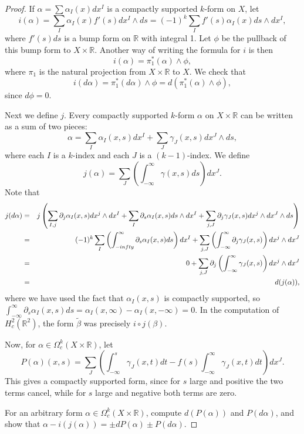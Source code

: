 \documentclass[12pt]{amsbook}
\newcommand{\R}{{\mathbb R}}
\theoremstyle{definition}
\begin{document}
\begin{proof}
If $\alpha = \sum \alpha_I(x) dx^I$ is a compactly supported $k$-form
on $X$, let 
$$i(\alpha) = \sum_I \alpha_I(x) f'(s) dx^I \wedge ds =
(-1)^k \sum_I f'(s) \alpha_I(x) ds \wedge dx^I,$$ 
where $f'(s)ds$ is a
bump form on $\R$ with integral 1.  Let $\phi$ be the pullback of this
bump form to $X \times \R$.  Another way of writing the formula for
$i$ is then
$$i(\alpha) = \pi_1^*(\alpha) \wedge \phi,$$
where $\pi_1$ is the natural projection from $X \times \R$ to $X$. We check that 
$$i(d\alpha) = \pi_1^*(d\alpha) \wedge \phi = d(\pi_1^*(\alpha) \wedge \phi),$$
since $d \phi =0$. 

Next we define $j$. Every compactly supported $k$-form $\alpha$ on $X \times \R$ can be written as a sum of two pieces:
$$ \alpha = \sum_I \alpha_I(x,s) dx^I + \sum_J \gamma_J(x,s) dx^J \wedge ds,$$
where each $I$ is a $k$-index and each $J$ is a $(k-1)$-index. We define
$$j(\alpha) = \sum_J \left ( \int_{-\infty}^\infty \gamma(x,s) ds \right ) dx^J.$$
Note that 
\begin{eqnarray} 
j(d\alpha) & = & j\left  (\sum_{I,j} \partial_j \alpha_I(x,s) dx^j \wedge dx^I + \sum_I \partial_s \alpha_I(x,s) ds \wedge dx^I
+ \sum_{j,J} \partial_j \gamma_J(x,s) dx^j \wedge dx^J \wedge ds \right )\cr 
& = & (-1)^k \sum_I \left ( \int_{-infty}^\infty \partial_s \alpha_I(x,s) ds \right ) dx^I + \sum_{j,J}
\left ( \int_{-\infty}^\infty \partial_j \gamma_J(x,s)\right ) dx^j \wedge dx^J \cr 
&=& 0 + \sum_{j,J} \partial_j \left ( \int_{-\infty}^\infty \gamma_J(x,s) \right ) dx^j \wedge dx^J \cr 
& = & d(j(\alpha)),
\end{eqnarray}
where we have used the fact that $\alpha_I(x,s)$ is compactly
supported, so $\int_{-\infty}^\infty \partial_s \alpha_I(x,s) ds =
\alpha_I(x,\infty)-\alpha_I(x,-\infty)=0.$ In the computation of
$H^2_c(\R^2)$, the form $\tilde \beta$ was precisely $i\circ
j(\beta)$.

Now, for $\alpha \in \Omega^k_c(X \times \R)$, let
$$ P(\alpha)(x,s) = \sum_J \left ( \int_{-\infty}^s \gamma_J(x,t) dt  - f(s) \int_{-\infty}^\infty \gamma_J(x,t) dt \right ) dx^J.$$ 
This gives a compactly supported form, since for $s$ large and
positive the two terms cancel, while for $s$ large and negative both
terms are zero.


\smallskip

 For an arbitrary form $\alpha \in
\Omega^{k}_c(X \times \R)$, compute $d(P( \alpha))$ and $P(d\alpha)$,
and show that $\alpha - i(j(\alpha)) = \pm dP(\alpha) \pm P(d\alpha)$.

\smallskip

\end{proof}
\end{document}
